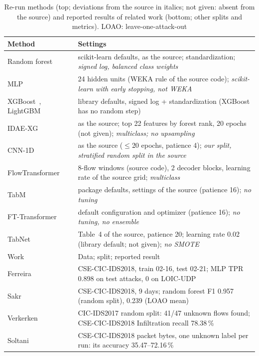\documentclass[runningheads,a4paper]{llncs}
\begin{document}
\begin{table}[t]
\caption{Re-run methods (top; deviations from the source in italics; not given: absent from the source) and reported results of related work (bottom; other splits and metrics). LOAO: leave-one-attack-out}\label{tab:baselines}\label{tab:literature}
\centering\scriptsize
\setlength{\tabcolsep}{2.5pt}
\begin{tabular}{L{2.4cm}L{9.2cm}}
\toprule
Method & Settings \\
\midrule
Random forest~\cite{sakr2026} & scikit-learn defaults, as the source; standardization; \emph{signed log, balanced class weights} \\
MLP~\cite{ferreira2020} & 24 hidden units (WEKA rule of the source code); \emph{scikit-learn with early stopping, not WEKA} \\
XGBoost~\cite{chen2016}, LightGBM~\cite{ke2017} & library defaults, signed log + standardization (XGBoost has no random step) \\
IDAE-XG~\cite{kang2022} & as the source; top 22 features by forest rank, 20 epochs (not given); \emph{multiclass; no upsampling} \\
CNN-1D~\cite{donoso2026} & as the source ($\le$20 epochs, patience 4); \emph{our split, stratified random split in the source} \\
FlowTransformer~\cite{manocchio2024} & 8-flow windows (source code), 2 decoder blocks, learning rate of the source grid; \emph{multiclass} \\
TabM~\cite{gorishniy2025} & package defaults, settings of the source (patience 16); \emph{no tuning} \\
FT-Transformer~\cite{gorishniy2021} & default configuration and optimizer (patience 16); \emph{no tuning, no ensemble} \\
TabNet~\cite{zegarra2023} & Table~4 of the source, patience 20; learning rate 0.02 (library default; not given); \emph{no SMOTE} \\
\midrule
Work & Data; split; reported result \\
\midrule
Ferreira~\cite{ferreira2020} & CSE-CIC-IDS2018, train 02-16, test 02-21; MLP TPR 0.898 on test attacks, 0 on LOIC-UDP \\
Sakr~\cite{sakr2026} & CSE-CIC-IDS2018, 9 days; random forest F1 0.957 (random split), 0.239 (LOAO mean) \\
Verkerken~\cite{verkerken2023} & CIC-IDS2017 random split: 41/47 unknown flows found; CSE-CIC-IDS2018 Infiltration recall 78.38\,\% \\
Soltani~\cite{soltani2021} & CSE-CIC-IDS2018 packet bytes, one unknown label per run: its accuracy 35.47--72.16\,\% \\
\bottomrule
\end{tabular}
\end{table}
\end{document}
